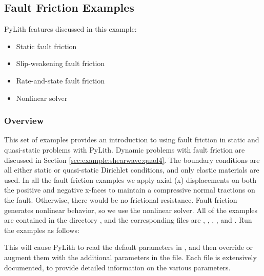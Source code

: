 \subsection{Fault Friction Examples}
\label{sec:example:3dhex8:friction}

PyLith features discussed in this example:
\begin{itemize}
\item Static fault friction
\item Slip-weakening fault friction
\item Rate-and-state fault friction
\item Nonlinear solver
\end{itemize}

\subsubsection{Overview}

This set of examples provides an introduction to using fault friction
in static and quasi-static problems with PyLith. Dynamic problems
with fault friction are discussed in Section \vref{sec:example:shearwave:quad4}.
The boundary conditions are all either static or quasi-static Dirichlet
conditions, and only elastic materials are used. In all the fault
friction examples we apply axial (x) displacements on both the positive
and negative x-faces to maintain a compressive normal tractions on
the fault. Otherwise, there would be no frictional resistance. Fault
friction generates nonlinear behavior, so we use the nonlinear solver.
All of the examples are contained in the directory ,
and the corresponding  files are ,
, , , and
. Run the examples as follows:
This will cause PyLith to read the default parameters in ,
and then override or augment them with the additional parameters in
the  file. Each  file is extensively
documented, to provide detailed information on the various parameters.


